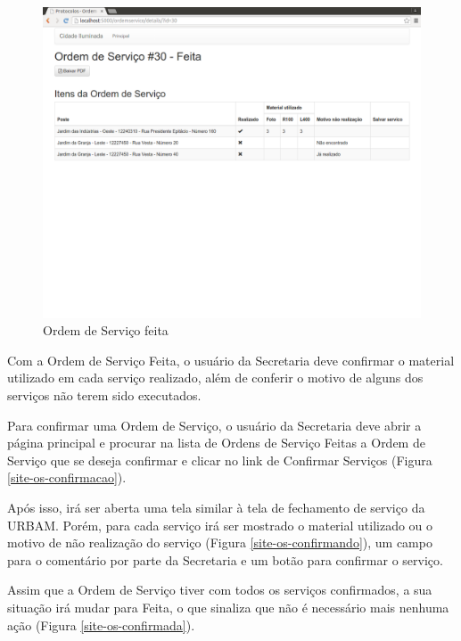 \documentclass[
	article,			%
	11pt,				%
	oneside,			%
	a4paper,			%
	english,			%
	brazil,				%
	sumario=tradicional
	]{abntex2}
\begin{document}
\begin{figure}[!htbp]
 \centering
 \caption{\label{site-os-feita}Ordem de Serviço feita}
 \includegraphics[scale=0.25]{site/17-os_feita.png}
\end{figure}

\clearpage

Com a Ordem de Serviço Feita, o usuário da Secretaria deve confirmar o material utilizado em cada serviço realizado, além de conferir o motivo de alguns dos serviços não terem sido executados.

Para confirmar uma Ordem de Serviço, o usuário da Secretaria deve abrir a página principal e procurar na lista de Ordens de Serviço Feitas a Ordem de Serviço que se deseja confirmar e clicar no link de Confirmar Serviços (Figura \ref{site-os-confirmacao}).

Após isso, irá ser aberta uma tela similar à tela de fechamento de serviço da URBAM. Porém, para cada serviço irá ser mostrado o material utilizado ou o motivo de não realização do serviço (Figura \ref{site-os-confirmando}), um campo para o comentário por parte da Secretaria e um botão para confirmar o serviço.

Assim que a Ordem de Serviço tiver com todos os serviços confirmados, a sua situação irá mudar para Feita, o que sinaliza que não é necessário mais nenhuma ação (Figura \ref{site-os-confirmada}).
\end{document}
